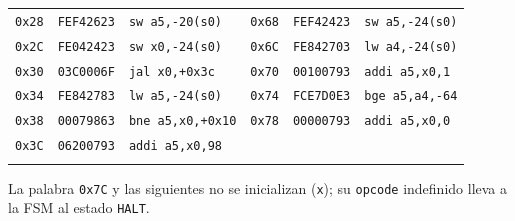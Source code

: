 \documentclass[conference]{IEEEtran}
\newcommand{\cod}[1]{\texttt{\small #1}}
\begin{document}
\begin{center}
\begin{tabular}{@{}lll@{\hspace{2em}}lll@{}}
\cod{0x28} & \cod{FEF42623} & \cod{sw a5,-20(s0)} & \cod{0x68} & \cod{FEF42423} & \cod{sw a5,-24(s0)}\\
\cod{0x2C} & \cod{FE042423} & \cod{sw x0,-24(s0)} & \cod{0x6C} & \cod{FE842703} & \cod{lw a4,-24(s0)}\\
\cod{0x30} & \cod{03C0006F} & \cod{jal x0,+0x3c} & \cod{0x70} & \cod{00100793} & \cod{addi a5,x0,1}\\
\cod{0x34} & \cod{FE842783} & \cod{lw a5,-24(s0)} & \cod{0x74} & \cod{FCE7D0E3} & \cod{bge a5,a4,-64}\\
\cod{0x38} & \cod{00079863} & \cod{bne a5,x0,+0x10} & \cod{0x78} & \cod{00000793} & \cod{addi a5,x0,0}\\
\cod{0x3C} & \cod{06200793} & \cod{addi a5,x0,98} &  & & \\
\\\bottomrule
\end{tabular}

\smallskip\footnotesize La palabra \cod{0x7C} y las siguientes no se inicializan (\cod{x}); su \cod{opcode} indefinido lleva a la FSM al estado \cod{HALT}.
\end{center}
\end{document}
